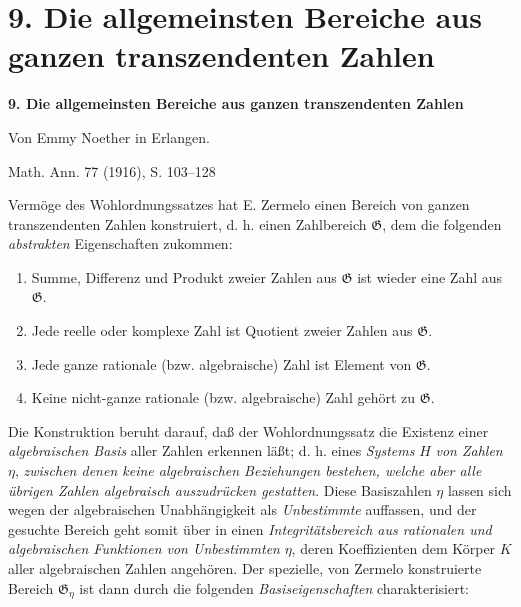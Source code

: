 \section*{9. Die allgemeinsten Bereiche aus ganzen transzendenten Zahlen}
\begin{center}
{\Large\bfseries 9. Die allgemeinsten Bereiche aus ganzen transzendenten Zahlen}\par
\vspace{0.75em}
Von Emmy Noether in Erlangen.\par
\vspace{1.2em}
Math. Ann. 77 (1916), S. 103--128
\end{center}

Vermöge des Wohlordnungssatzes hat E. Zermelo einen Bereich von
\glqq{}ganzen transzendenten Zahlen\grqq{} konstruiert, d. h. einen Zahlbereich
$\mathfrak G$, dem die folgenden \emph{abstrakten} Eigenschaften zukommen:
\begin{enumerate}
\item[I.] Summe, Differenz und Produkt zweier Zahlen aus $\mathfrak G$ ist wieder
eine Zahl aus $\mathfrak G$.
\item[II.] Jede reelle oder komplexe Zahl ist Quotient zweier Zahlen aus $\mathfrak G$.
\item[III.] Jede ganze rationale (bzw. algebraische) Zahl ist Element von $\mathfrak G$.
\item[IV.] Keine nicht-ganze rationale (bzw. algebraische) Zahl gehört zu
$\mathfrak G$.
\end{enumerate}

Die Konstruktion beruht darauf, daß der Wohlordnungssatz die Existenz
einer \emph{algebraischen Basis} aller Zahlen erkennen läßt; d. h. eines
\emph{Systems} $H$ \emph{von Zahlen} $\eta$, \emph{zwischen denen keine
algebraischen Beziehungen bestehen, welche aber alle übrigen Zahlen algebraisch
auszudrücken gestatten}. Diese Basiszahlen $\eta$ lassen sich wegen der
algebraischen Unabhängigkeit als \emph{Unbestimmte} auffassen, und der gesuchte
Bereich geht somit über in einen \emph{Integritätsbereich aus rationalen und
algebraischen Funktionen von Unbestimmten} $\eta$, deren Koeffizienten dem Körper $K$ aller
algebraischen Zahlen angehören. Der spezielle, von Zermelo konstruierte
Bereich $\mathfrak G_\eta$ ist dann durch die folgenden \emph{Basiseigenschaften}
charakterisiert:

